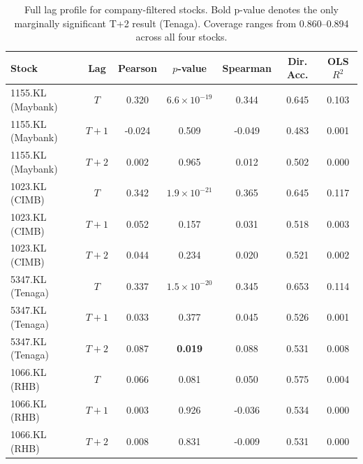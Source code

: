 \documentclass[12pt]{ucetd}
\begin{document}
\begin{table}[H]
\caption{Full lag profile for company-filtered stocks. Bold p-value denotes the only marginally significant T+2 result (Tenaga). Coverage ranges from 0.860--0.894 across all four stocks.}
\label{tab:experiment2-filtered-lag}
\centering
\small
\begin{tabular}{|l|c|c|c|c|c|c|}
\hline
\textbf{Stock} & \textbf{Lag} & \textbf{Pearson} & \textbf{$p$-value} & \textbf{Spearman} & \textbf{Dir. Acc.} & \textbf{OLS $R^2$} \\
\hline
1155.KL (Maybank) & $T$     &  0.320 & $6.6{\times}10^{-19}$ &  0.344 & 0.645 & 0.103 \\
1155.KL (Maybank) & $T{+}1$ & -0.024 & 0.509                 & -0.049 & 0.483 & 0.001 \\
1155.KL (Maybank) & $T{+}2$ &  0.002 & 0.965                 &  0.012 & 0.502 & 0.000 \\
\hline
1023.KL (CIMB)    & $T$     &  0.342 & $1.9{\times}10^{-21}$ &  0.365 & 0.645 & 0.117 \\
1023.KL (CIMB)    & $T{+}1$ &  0.052 & 0.157                 &  0.031 & 0.518 & 0.003 \\
1023.KL (CIMB)    & $T{+}2$ &  0.044 & 0.234                 &  0.020 & 0.521 & 0.002 \\
\hline
5347.KL (Tenaga)  & $T$     &  0.337 & $1.5{\times}10^{-20}$ &  0.345 & 0.653 & 0.114 \\
5347.KL (Tenaga)  & $T{+}1$ &  0.033 & 0.377                 &  0.045 & 0.526 & 0.001 \\
5347.KL (Tenaga)  & $T{+}2$ &  0.087 & \textbf{0.019}        &  0.088 & 0.531 & 0.008 \\
\hline
1066.KL (RHB)     & $T$     &  0.066 & 0.081                 &  0.050 & 0.575 & 0.004 \\
1066.KL (RHB)     & $T{+}1$ &  0.003 & 0.926                 & -0.036 & 0.534 & 0.000 \\
1066.KL (RHB)     & $T{+}2$ &  0.008 & 0.831                 & -0.009 & 0.531 & 0.000 \\
\hline
\end{tabular}
\end{table}
\end{document}
